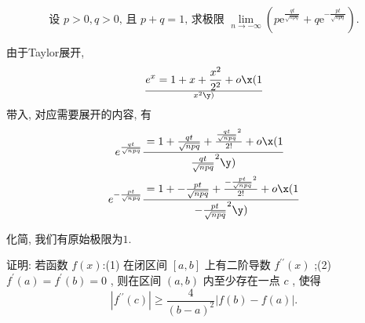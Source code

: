 
\begin{prob} %
    $$\text { 设 } p>0, q>0 \text {, 且 } p+q=1 \text {, 求极限 } \lim _{n \rightarrow-\infty}\left(p \mathrm{e}^{\frac{qt}{\sqrt{n p q}}}+q \mathrm{e}^{-\frac{pt}{\sqrt{npq}}}\right) \text {. }$$ 
\end{prob} 

\begin{sol}%
    由于Taylor展开, 
    $$
    e^x=1+{x}+{x^2\over 2^2}+o\x(1\over x^2\y)
    $$
    带入, 对应需要展开的内容, 有
    $$
    \begin{aligned}
        e^{\frac{qt}{\sqrt{n p q}}}& =1+{\frac{qt}{\sqrt{n p q}}}+{\frac{qt}{\sqrt{n p q}}^2\over 2!}+o\x(1\over \frac{qt}{\sqrt{n p q}}^2\y)\\
        e^{-\frac{pt}{\sqrt{npq}}}& =1+{-\frac{pt}{\sqrt{npq}}}+{-\frac{pt}{\sqrt{npq}}^2\over 2!}+o\x(1\over -\frac{pt}{\sqrt{npq}}^2\y)
    \end{aligned}
    $$

    化简, 我们有原始极限为$1$. 
\end{sol}


\begin{prob} %

    证明: 若函数  $f(x)$:(1)  在闭区间  $[a, b]$  上有二阶导数  $f^{\prime \prime}(x)$ ;(2) $f^{\prime}(a)=   f^{\prime}(b)=0$ , 则在区间  $(a, b)$  内至少存在一点  $c$ , 使得
$$
\left|f^{\prime \prime}(c)\right| \geqslant \frac{4}{(b-a)^{2}}|f(b)-f(a)| .
$$

\end{prob} 

